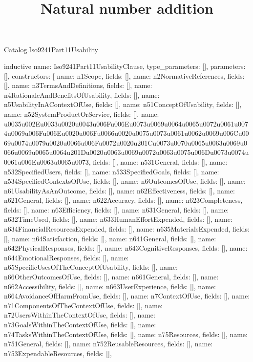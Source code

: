 \begin{lexlean}{Catalog.Iso9241Part11Usability}
\title{Natural number addition}
\begin{semanticmodule}
inductive{
  name: Iso9241Part11UsabilityClause,
  type_parameters: [],
  parameters: [],
  constructors: [
    {name: n1Scope, fields: []},
    {name: n2NormativeReferences, fields: []},
    {name: n3TermsAndDefinitions, fields: []},
    {name: n4RationaleAndBenefitsOfUsability, fields: []},
    {name: n5UsabilityInAContextOfUse, fields: []},
    {name: n51ConceptOfUsability, fields: []},
    {name: n52SystemProductOrService, fields: []},
    {name: u0035u002Eu0033u0020u0043u006Fu006Eu0073u0069u0064u0065u0072u0061u0074u0069u006Fu006Eu0020u006Fu0066u0020u0075u0073u0061u0062u0069u006Cu0069u0074u0079u0020u0066u006Fu0072u0020u201Cu0073u0070u0065u0063u0069u0066u0069u0065u0064u201Du0020u0063u0069u0072u0063u0075u006Du0073u0074u0061u006Eu0063u0065u0073, fields: []},
    {name: n531General, fields: []},
    {name: n532SpecifiedUsers, fields: []},
    {name: n533SpecifiedGoals, fields: []},
    {name: n534SpecifiedContextsOfUse, fields: []},
    {name: n6OutcomesOfUse, fields: []},
    {name: n61UsabilityAsAnOutcome, fields: []},
    {name: n62Effectiveness, fields: []},
    {name: n621General, fields: []},
    {name: n622Accuracy, fields: []},
    {name: n623Completeness, fields: []},
    {name: n63Efficiency, fields: []},
    {name: n631General, fields: []},
    {name: n632TimeUsed, fields: []},
    {name: n633HumanEffortExpended, fields: []},
    {name: n634FinancialResourcesExpended, fields: []},
    {name: n635MaterialsExpended, fields: []},
    {name: n64Satisfaction, fields: []},
    {name: n641General, fields: []},
    {name: n642PhysicalResponses, fields: []},
    {name: n643CognitiveResponses, fields: []},
    {name: n644EmotionalResponses, fields: []},
    {name: n65SpecificUsesOfTheConceptOfUsability, fields: []},
    {name: n66OtherOutcomesOfUse, fields: []},
    {name: n661General, fields: []},
    {name: n662Accessibility, fields: []},
    {name: n663UserExperience, fields: []},
    {name: n664AvoidanceOfHarmFromUse, fields: []},
    {name: n7ContextOfUse, fields: []},
    {name: n71ComponentsOfTheContextOfUse, fields: []},
    {name: n72UsersWithinTheContextOfUse, fields: []},
    {name: n73GoalsWithinTheContextOfUse, fields: []},
    {name: n74TasksWithinTheContextOfUse, fields: []},
    {name: n75Resources, fields: []},
    {name: n751General, fields: []},
    {name: n752ReusableResources, fields: []},
    {name: n753ExpendableResources, fields: []},
}
\end{semanticmodule}
\end{lexlean}
